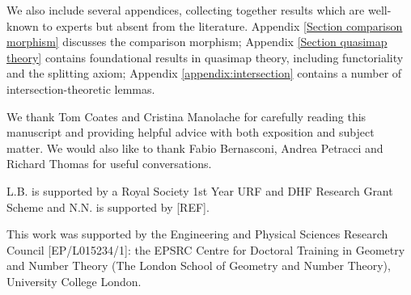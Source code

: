 We also include several appendices, collecting together results which are well-known to experts but absent from the literature. Appendix \ref{Section comparison morphism} discusses the comparison morphism; Appendix \ref{Section quasimap theory} contains foundational results in quasimap theory, including functoriality and the splitting axiom; Appendix \ref{appendix:intersection} contains a number of intersection-theoretic lemmas.

\begin{acknowledgements} We thank Tom Coates and Cristina Manolache for carefully reading this manuscript and providing helpful advice with both exposition and subject matter. We would also like to thank Fabio Bernasconi, Andrea Petracci and Richard Thomas for useful conversations. 

L.B. is supported by a Royal Society 1st Year URF and DHF Research Grant Scheme and N.N. is supported by [REF].

This work was supported by the Engineering and Physical Sciences Research Council [EP/L015234/1]: the EPSRC Centre for Doctoral Training in Geometry and Number Theory (The London School of Geometry and Number Theory), University College London.
\end{acknowledgements}
